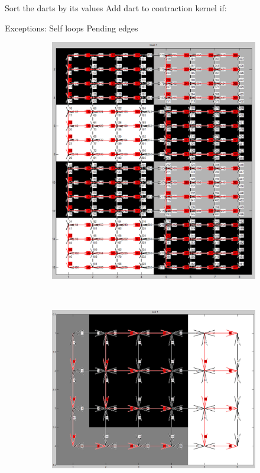 \documentclass[12pt]{article}
\begin{document}
Sort the darts by its values
Add dart to contraction kernel if:

Exceptions:
Self loops
Pending edges

\begin{figure}[tb]
  \centering

    \begin{subfigure}[t]{0.3\textwidth}
      \includegraphics[width=\textwidth]{img/contract2.jpg}
      \caption{}\label{fig:dart_contract2}
    \end{subfigure}
    ~
    \begin{subfigure}[t]{0.3\textwidth}
      \includegraphics[width=\textwidth]{img/contract3.jpg}

\end{subfigure}
\end{figure}
\end{document}
